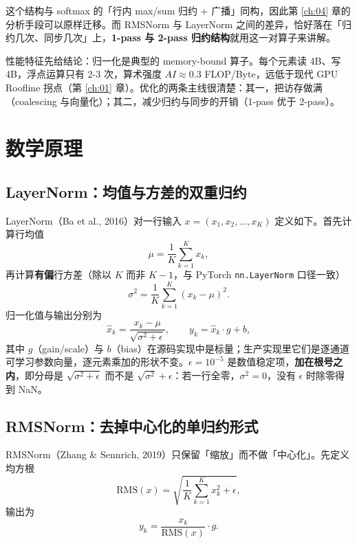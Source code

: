 这个结构与 softmax 的「行内 max/sum 归约 + 广播」同构，因此第 \ref{ch:04} 章的分析手段可以原样迁移。而 RMSNorm 与 LayerNorm 之间的差异，恰好落在「归约几次、同步几次」上，\textbf{1-pass 与 2-pass 归约结构}就用这一对算子来讲解。

性能特征先给结论：归一化是典型的 memory-bound 算子。每个元素读 4B、写 4B，浮点运算只有 2-3 次，算术强度 $AI \approx 0.3$ FLOP/Byte，远低于现代 GPU Roofline 拐点（第 \ref{ch:01} 章）。优化的两条主线很清楚：其一，把访存做满（coalescing 与向量化）；其二，减少归约与同步的开销（1-pass 优于 2-pass）。

\section{数学原理}

\subsection{LayerNorm：均值与方差的双重归约}

LayerNorm（Ba et al., 2016）对一行输入 $x = (x_1, x_2, \dots, x_K)$ 定义如下。首先计算行均值
\begin{equation}
  \mu = \frac{1}{K}\sum_{k=1}^{K} x_k ,
\end{equation}
再计算\textbf{有偏}行方差（除以 $K$ 而非 $K-1$，与 PyTorch \texttt{nn.\allowbreak{}Layer\allowbreak{}Norm} 口径一致）
\begin{equation}
  \sigma^2 = \frac{1}{K}\sum_{k=1}^{K}\left(x_k - \mu\right)^2 .
\end{equation}
归一化值与输出分别为
\begin{equation}
  \hat{x}_k = \frac{x_k - \mu}{\sqrt{\sigma^2 + \epsilon}}, \qquad
  y_k = \hat{x}_k \cdot g + b ,
  \label{eq:ch06-ln}
\end{equation}
其中 $g$（gain/scale）与 $b$（bias）在源码实现中是标量；生产实现里它们是逐通道可学习参数向量，逐元素乘加的形状不变。$\epsilon = 10^{-5}$ 是数值稳定项，\textbf{加在根号之内}，即分母是 $\sqrt{\sigma^2 + \epsilon}$ 而不是 $\sqrt{\sigma^2} + \epsilon$：若一行全零，$\sigma^2=0$，没有 $\epsilon$ 时除零得到 NaN。

\subsection{RMSNorm：去掉中心化的单归约形式}

RMSNorm（Zhang \& Sennrich, 2019）只保留「缩放」而不做「中心化」。先定义均方根
\begin{equation}
  \mathrm{RMS}(x) = \sqrt{\frac{1}{K}\sum_{k=1}^{K} x_k^2 + \epsilon},
\end{equation}
输出为
\begin{equation}
  y_k = \frac{x_k}{\mathrm{RMS}(x)} \cdot g .
  \label{eq:ch06-rms}
\end{equation}

